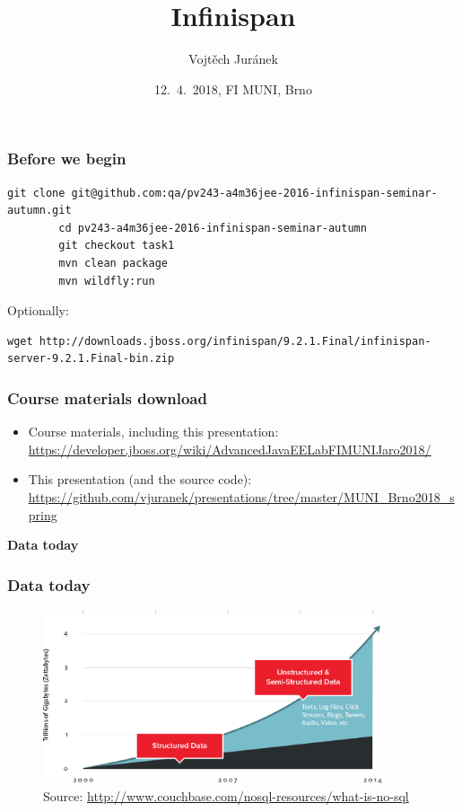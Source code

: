 \documentclass[10pt,utf8]{beamer}
\title{Infinispan}
\author{Vojtěch Juránek}
\institute[Red Hat]{JBoss - a division by Red Hat}
\date{12.~4.~2018, FI MUNI, Brno}
\begin{document}


\begin{frame}[fragile]
	\frametitle{Before we begin}
	\begin{lstlisting}[style=Bash]
		git clone git@github.com:qa/pv243-a4m36jee-2016-infinispan-seminar-autumn.git
		cd pv243-a4m36jee-2016-infinispan-seminar-autumn
		git checkout task1
		mvn clean package
		mvn wildfly:run
	\end{lstlisting}
	\vspace{0.5cm}
	Optionally:
	\begin{lstlisting}[style=Bash]
		wget http://downloads.jboss.org/infinispan/9.2.1.Final/infinispan-server-9.2.1.Final-bin.zip
	\end{lstlisting}
\end{frame}

\begin{frame}
 \titlepage
\end{frame}

\begin{frame}
	\frametitle{Course materials download}
	\scriptsize{
	\begin{itemize}
		\item Course materials, including this presentation:\\
		\color{blue}\url{https://developer.jboss.org/wiki/AdvancedJavaEELabFIMUNIJaro2018/}\color{black}
		\item This presentation (and the source code):\\ 
		\color{blue}\url{https://github.com/vjuranek/presentations/tree/master/MUNI_Brno2018_spring}\color{black}
	\end{itemize}
	}
\end{frame}

\begin{frame}
	\centering
	\huge{\textbf{Data today}}
\end{frame}


\begin{frame}
	\frametitle{Data today}
	\begin{figure}
		\centering
		\includegraphics[width=10cm]{./img/why-nosql-2.eps}
		\caption{\tiny{Source: \url{http://www.couchbase.com/nosql-resources/what-is-no-sql}}}
	\end{figure}
\end{frame}
\end{document}
